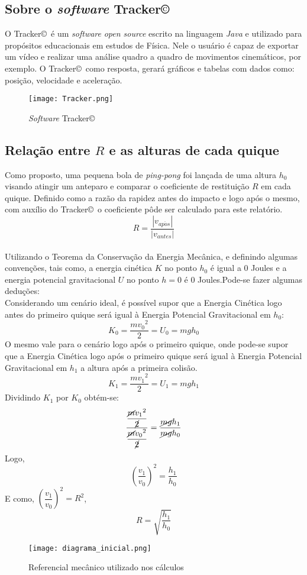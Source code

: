\documentclass[a4paper, 12pt]{article}
\begin{document}
		\newpage
		\subsection{Sobre o \textsl{software} Tracker\copyright}
		O Tracker\copyright \,  é um \textsl{software} \textsl{open source} escrito na linguagem \textsl{Java} e utilizado para propósitos educacionais em estudos de Física. Nele o usuário é capaz de exportar um vídeo e realizar uma análise quadro a quadro de movimentos cinemáticos, por exemplo. O Tracker\copyright \, como resposta, gerará gráficos e tabelas com dados como: posição, velocidade e aceleração. \\
		\begin{figure}[htb]
			\centering
			\texttt{[image: Tracker.png]}
			\caption{\textsl{Software} Tracker\copyright}
			\label{Software Tracker}
		\end{figure}
		
		\subsection{Relação entre $R$ e as alturas de cada quique}
		Como proposto, uma pequena bola de \textsl{ping-pong} foi lançada de uma altura $h_0$ visando atingir um anteparo e comparar o coeficiente de restituição $R$ em cada quique. Definido como a razão da rapidez antes do impacto e logo após o mesmo, com auxílio do Tracker\copyright \, o coeficiente pôde ser calculado para este relatório.
		$$R = \dfrac{|v_{ap \acute{o} s}|}{|v_{antes}|}$$ \\
		Utilizando o Teorema da Conservação da Energia Mecânica, e definindo algumas convenções, tais como, a energia cinética $K$ no ponto $h_0$ é igual a 0 Joules e a energia potencial gravitacional $U$ no ponto $h=0$ é 0 Joules.Pode-se fazer algumas deduções: \\
		Considerando um cenário ideal, é possível supor que a Energia Cinética logo antes do primeiro quique será igual à Energia Potencial Gravitacional em $h_0$:
		$$K_0 = \dfrac{m{v_0}^2}{2} = U_{0} = mgh_0$$
		O mesmo vale para o cenário logo após o primeiro quique, onde pode-se supor que a Energia Cinética logo após o primeiro quique será igual à Energia Potencial Gravitacional em $h_1$ a altura após a primeira colisão.
		$$K_1 = \dfrac{m{v_1}^2}{2} = U_{1} = mgh_1$$
		Dividindo $K_1$ por $K_0$ obtém-se:
		$$\dfrac{\dfrac{\cancel{m}{v_1}^2}{\cancel{2}}}{\dfrac{\cancel{m}{v_0}^2}{\cancel{2}}}=\dfrac{\cancel{mg}h_1}{\cancel{mg}h_0}$$
		Logo,
		$${\left(\dfrac{v_1}{v_0}\right)}^2= \dfrac{h_1}{h_0}$$
		E como, ${\left(\dfrac{v_1}{v_0}\right)}^2 = R^2$,
		$$R= \sqrt{\dfrac{h_1}{h_0}}$$
		\begin{figure}[htb]
			\centering
			\texttt{[image: diagrama\_inicial.png]}
			\caption{Referencial mecânico utilizado nos cálculos}
			\label{ref mec}
		\end{figure}
		
\end{document}
